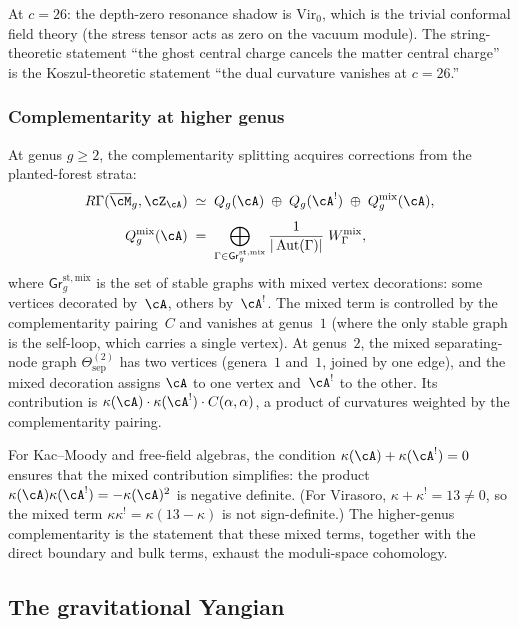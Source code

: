 At $c=26$: the depth-zero resonance shadow is $\mathrm{Vir}_0$,
which is the trivial conformal field theory (the stress tensor
acts as zero on the vacuum module). The string-theoretic
statement ``the ghost central charge cancels the matter central
charge'' is the Koszul-theoretic statement ``the dual curvature
vanishes at $c=26$.''

\subsubsection*{Complementarity at higher genus}

At genus $g\ge 2$, the complementarity splitting acquires
corrections from the planted-forest strata:
\begin{align*}
R\Gamma(\overline{\cM}_g,\cZ_\cA)
&\;\simeq\;
Q_g(\cA)\;\oplus\;Q_g(\cA^!)\;\oplus\;Q_g^{\mathrm{mix}}(\cA),\\[4pt]
Q_g^{\mathrm{mix}}(\cA)
&\;=\;
\bigoplus_{\Gamma\in\mathsf{Gr}^{\mathrm{st,mix}}_{g}}
\frac{1}{|\operatorname{Aut}(\Gamma)|}
\;W_\Gamma^{\mathrm{mix}},
\end{align*}
where $\mathsf{Gr}^{\mathrm{st,mix}}_g$ is the set of stable
graphs with mixed vertex decorations: some vertices decorated
by~$\cA$, others by~$\cA^!$. The mixed term is controlled by
the complementarity pairing~$C$ and vanishes at genus~$1$
(where the only stable graph is the self-loop, which carries
a single vertex). At genus~$2$, the mixed separating-node
graph $\Theta^{(2)}_{\mathrm{sep}}$ has two vertices
(genera~$1$ and~$1$, joined by one edge), and the mixed
decoration assigns $\cA$ to one vertex and~$\cA^!$ to the other.
Its contribution is $\kappa(\cA)\cdot\kappa(\cA^!)\cdot
C(\alpha,\alpha)$, a product of curvatures weighted by the
complementarity pairing.

For Kac--Moody and free-field algebras, the condition
$\kappa(\cA)+\kappa(\cA^!)=0$ ensures that the
mixed contribution simplifies: the product
$\kappa(\cA)\kappa(\cA^!)=-\kappa(\cA)^2$ is negative definite.
(For Virasoro, $\kappa+\kappa^!=13\ne 0$, so the mixed term
$\kappa\kappa^!=\kappa(13-\kappa)$ is not sign-definite.)
The higher-genus complementarity is the statement that these
mixed terms, together with the direct boundary and bulk terms,
exhaust the moduli-space cohomology.


\subsection*{The gravitational Yangian}

